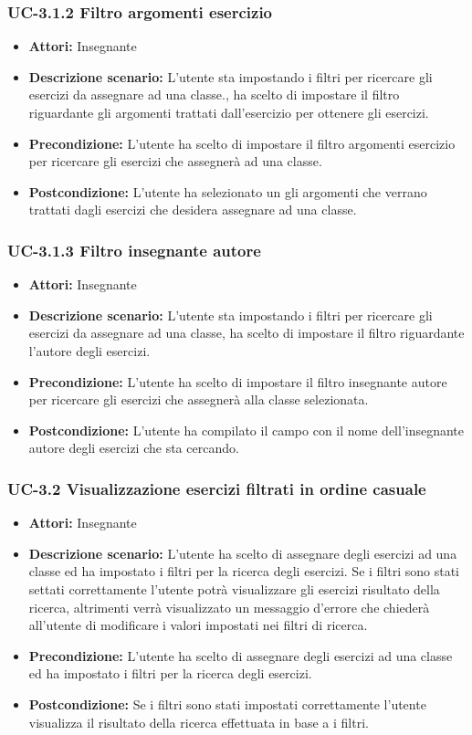 \subsubsection{UC-3.1.2 Filtro argomenti esercizio}
\begin{itemize}
		\item \textbf{Attori: } Insegnante
		\item \textbf{Descrizione scenario: }L'utente sta impostando i filtri per ricercare gli esercizi da assegnare ad una classe., ha scelto di impostare il filtro riguardante gli argomenti trattati dall'esercizio per ottenere gli esercizi.
		\item \textbf{Precondizione: }L'utente ha scelto di impostare il filtro argomenti esercizio per ricercare gli esercizi che assegnerà ad una classe.
		\item \textbf{Postcondizione: }L'utente ha selezionato un gli argomenti che verrano trattati dagli esercizi che desidera assegnare ad una classe.
\end{itemize}
\subsubsection{UC-3.1.3 Filtro insegnante autore}
\begin{itemize}
		\item \textbf{Attori: } Insegnante
		\item \textbf{Descrizione scenario: }L'utente sta impostando i filtri per ricercare gli esercizi da assegnare ad una classe, ha scelto di impostare il filtro riguardante l'autore degli esercizi.
		\item \textbf{Precondizione: }L'utente ha scelto di impostare il filtro insegnante autore per ricercare gli esercizi che assegnerà alla classe selezionata.
		\item \textbf{Postcondizione: }L'utente ha compilato il campo con il nome dell'insegnante autore degli esercizi che sta cercando.
\end{itemize}
\subsubsection{UC-3.2 Visualizzazione esercizi filtrati in ordine casuale}
\begin{itemize}
		\item \textbf{Attori: }Insegnante
		\item \textbf{Descrizione scenario: }L'utente ha scelto di assegnare degli esercizi ad una classe ed ha impostato i filtri per la ricerca degli esercizi. Se i filtri sono stati settati correttamente l'utente potrà visualizzare gli esercizi risultato della ricerca, altrimenti verrà visualizzato un messaggio d'errore che chiederà all'utente di modificare i valori impostati nei filtri di ricerca.
		\item \textbf{Precondizione: }L'utente ha scelto di assegnare degli esercizi ad una classe ed ha impostato i filtri per la ricerca degli esercizi.
		\item \textbf{Postcondizione: }Se i filtri sono stati impostati correttamente l'utente visualizza il risultato della ricerca effettuata in base a i filtri.
\end{itemize}
